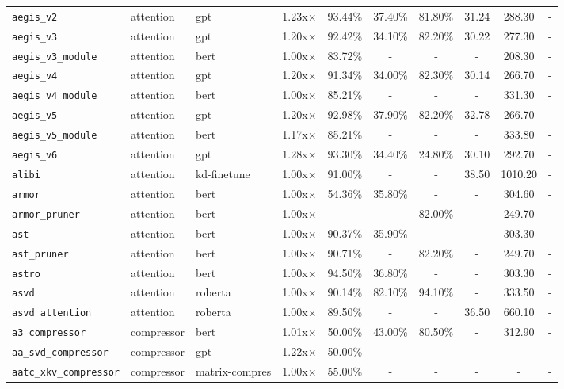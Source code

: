 \begin{center}
\begin{longtable}{lllccccccr}
\texttt{aegis\_v2} & attention & gpt & 1.23x$\times$ & 93.44\% & 37.40\% & 81.80\% & 31.24 & 288.30 & - \\
\texttt{aegis\_v3} & attention & gpt & 1.20x$\times$ & 92.42\% & 34.10\% & 82.20\% & 30.22 & 277.30 & - \\
\texttt{aegis\_v3\_module} & attention & bert & 1.00x$\times$ & 83.72\% & - & - & - & 208.30 & - \\
\texttt{aegis\_v4} & attention & gpt & 1.20x$\times$ & 91.34\% & 34.00\% & 82.30\% & 30.14 & 266.70 & - \\
\texttt{aegis\_v4\_module} & attention & bert & 1.00x$\times$ & 85.21\% & - & - & - & 331.30 & - \\
\texttt{aegis\_v5} & attention & gpt & 1.20x$\times$ & 92.98\% & 37.90\% & 82.20\% & 32.78 & 266.70 & - \\
\texttt{aegis\_v5\_module} & attention & bert & 1.17x$\times$ & 85.21\% & - & - & - & 333.80 & - \\
\texttt{aegis\_v6} & attention & gpt & 1.28x$\times$ & 93.30\% & 34.40\% & 24.80\% & 30.10 & 292.70 & - \\
\texttt{alibi} & attention & kd-finetune & 1.00x$\times$ & 91.00\% & - & - & 38.50 & 1010.20 & - \\
\texttt{armor} & attention & bert & 1.00x$\times$ & 54.36\% & 35.80\% & - & - & 304.60 & - \\
\texttt{armor\_pruner} & attention & bert & 1.00x$\times$ & - & - & 82.00\% & - & 249.70 & - \\
\texttt{ast} & attention & bert & 1.00x$\times$ & 90.37\% & 35.90\% & - & - & 303.30 & - \\
\texttt{ast\_pruner} & attention & bert & 1.00x$\times$ & 90.71\% & - & 82.20\% & - & 249.70 & - \\
\texttt{astro} & attention & bert & 1.00x$\times$ & 94.50\% & 36.80\% & - & - & 303.30 & - \\
\texttt{asvd} & attention & roberta & 1.00x$\times$ & 90.14\% & 82.10\% & 94.10\% & - & 333.50 & - \\
\texttt{asvd\_attention} & attention & roberta & 1.00x$\times$ & 89.50\% & - & - & 36.50 & 660.10 & - \\
\texttt{a3\_compressor} & compressor & bert & 1.01x$\times$ & 50.00\% & 43.00\% & 80.50\% & - & 312.90 & - \\
\texttt{aa\_svd\_compressor} & compressor & gpt & 1.22x$\times$ & 50.00\% & - & - & - & - & - \\
\texttt{aatc\_xkv\_compressor} & compressor & matrix-compres & 1.00x$\times$ & 55.00\% & - & - & - & - & - \\

\end{longtable}
\end{center}
